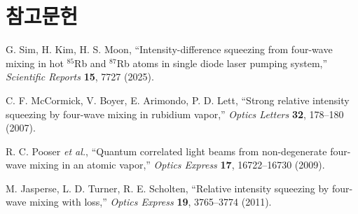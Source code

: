 \documentclass[11pt,a4paper]{article}
\begin{document}
\section{참고문헌}
\begin{enumerate}[label={[\arabic*]},leftmargin=*]
\item G. Sim, H. Kim, H. S. Moon, ``Intensity-difference squeezing from four-wave mixing
      in hot $^{85}$Rb and $^{87}$Rb atoms in single diode laser pumping system,''
      \textit{Scientific Reports} \textbf{15}, 7727 (2025).
\item C. F. McCormick, V. Boyer, E. Arimondo, P. D. Lett,
      ``Strong relative intensity squeezing by four-wave mixing in rubidium vapor,''
      \textit{Optics Letters} \textbf{32}, 178--180 (2007).
\item R. C. Pooser \textit{et al.}, ``Quantum correlated light beams from non-degenerate
      four-wave mixing in an atomic vapor,'' \textit{Optics Express} \textbf{17},
      16722--16730 (2009).
\item M. Jasperse, L. D. Turner, R. E. Scholten, ``Relative intensity squeezing by
      four-wave mixing with loss,'' \textit{Optics Express} \textbf{19}, 3765--3774 (2011).
\end{enumerate}
\end{document}
